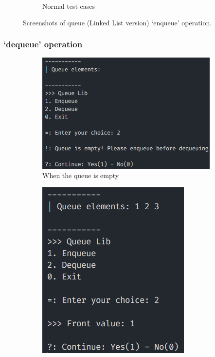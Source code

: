 \begin{figure}[!ht]
\begin{subfigure}{0.43\textwidth}
		\caption{Normal test cases}\label{fig:queue_ll_push_normal}
	\end{subfigure}
	\caption{Screenshots of queue (Linked List version) `enqueue' operation.}\label{fig:queue_ll_push_cases}
\end{figure}
\subsubsection*{`dequeue' operation}
\begin{figure}[!ht]
	\centering
	\begin{subfigure}{0.6\textwidth}
		\centering
		\includegraphics[width=\textwidth]{imgs/queueLinkedList/pop/empty.png}
		\caption{When the queue is empty}\label{fig:queue_ll_pop_empty}
	\end{subfigure}
	\hfill
	\begin{subfigure}{0.34\textwidth}
		\centering
		\includegraphics[width=\textwidth]{imgs/queueLinkedList/pop/normal.png}

\end{subfigure}
\end{figure}
